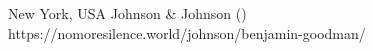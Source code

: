           {New York, USA}
          {}
          {Johnson \& Johnson}
          {}
          {
             ()
          }
          {https://nomoresilence.world/johnson/benjamin-goodman/}


